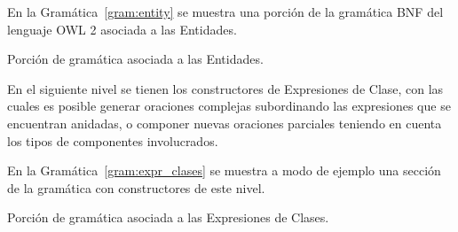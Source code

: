 En la Gramática~\ref{gram:entity} se muestra una porción de la gramática BNF del lenguaje OWL 2 asociada a las Entidades.
\begin{GrammarEnv}
\begin{grammar}
[(colon){$\rightarrow$}]
[(semicolon)$|$]
[(comma){}]
[(period){\vspace{0.3cm} \\}]
[(quote){\begin{bf}}{\end{bf}}]
[(nonterminal){$<$}{$>$}]
\end{grammar}
\caption{Porción de gramática asociada a las Entidades.}\label{gram:entity}
\end{GrammarEnv}

En el siguiente nivel se tienen los constructores de Expresiones de Clase, con las cuales es posible generar oraciones complejas subordinando las expresiones que se encuentran anidadas, o componer nuevas oraciones parciales teniendo en cuenta los tipos de componentes involucrados.

En la Gramática~\ref{gram:expr_clases} se muestra a modo de ejemplo una sección de la gramática con constructores de este nivel.
\begin{GrammarEnv}
\begin{grammar}
[(colon){$\rightarrow$}]
[(semicolon)$|$]
[(comma){}]
[(period){\vspace{0.3cm} \\}]
[(quote){\begin{bf}}{\end{bf}}]
[(nonterminal){$<$}{$>$}]
\end{grammar}
\caption{Porción de gramática asociada a las Expresiones de Clases.}\label{gram:expr_clases}
\end{GrammarEnv}


